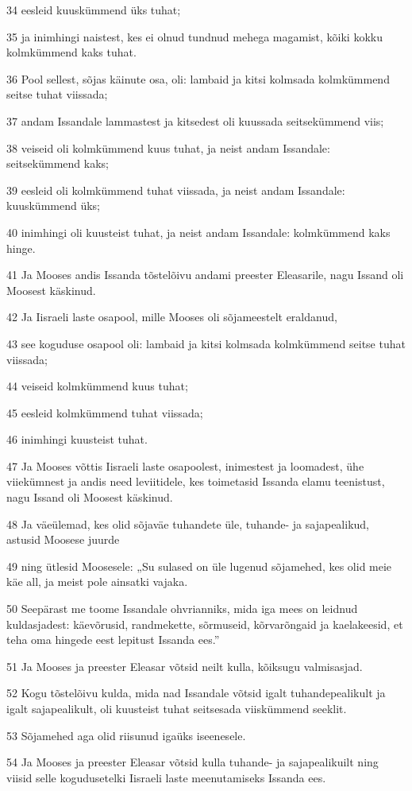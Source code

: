 \par 34 eesleid kuuskümmend üks tuhat;
\par 35 ja inimhingi naistest, kes ei olnud tundnud mehega magamist, kõiki kokku kolmkümmend kaks tuhat.
\par 36 Pool sellest, sõjas käinute osa, oli: lambaid ja kitsi kolmsada kolmkümmend seitse tuhat viissada;
\par 37 andam Issandale lammastest ja kitsedest oli kuussada seitsekümmend viis;
\par 38 veiseid oli kolmkümmend kuus tuhat, ja neist andam Issandale: seitsekümmend kaks;
\par 39 eesleid oli kolmkümmend tuhat viissada, ja neist andam Issandale: kuuskümmend üks;
\par 40 inimhingi oli kuusteist tuhat, ja neist andam Issandale: kolmkümmend kaks hinge.
\par 41 Ja Mooses andis Issanda tõstelõivu andami preester Eleasarile, nagu Issand oli Moosest käskinud.
\par 42 Ja Iisraeli laste osapool, mille Mooses oli sõjameestelt eraldanud,
\par 43 see koguduse osapool oli: lambaid ja kitsi kolmsada kolmkümmend seitse tuhat viissada;
\par 44 veiseid kolmkümmend kuus tuhat;
\par 45 eesleid kolmkümmend tuhat viissada;
\par 46 inimhingi kuusteist tuhat.
\par 47 Ja Mooses võttis Iisraeli laste osapoolest, inimestest ja loomadest, ühe viiekümnest ja andis need leviitidele, kes toimetasid Issanda elamu teenistust, nagu Issand oli Moosest käskinud.
\par 48 Ja väeülemad, kes olid sõjaväe tuhandete üle, tuhande- ja sajapealikud, astusid Moosese juurde
\par 49 ning ütlesid Moosesele: „Su sulased on üle lugenud sõjamehed, kes olid meie käe all, ja meist pole ainsatki vajaka.
\par 50 Seepärast me toome Issandale ohvrianniks, mida iga mees on leidnud kuldasjadest: käevõrusid, randmekette, sõrmuseid, kõrvarõngaid ja kaelakeesid, et teha oma hingede eest lepitust Issanda ees.”
\par 51 Ja Mooses ja preester Eleasar võtsid neilt kulla, kõiksugu valmisasjad.
\par 52 Kogu tõstelõivu kulda, mida nad Issandale võtsid igalt tuhandepealikult ja igalt sajapealikult, oli kuusteist tuhat seitsesada viiskümmend seeklit.
\par 53 Sõjamehed aga olid riisunud igaüks iseenesele.
\par 54 Ja Mooses ja preester Eleasar võtsid kulla tuhande- ja sajapealikuilt ning viisid selle kogudusetelki Iisraeli laste meenutamiseks Issanda ees.

